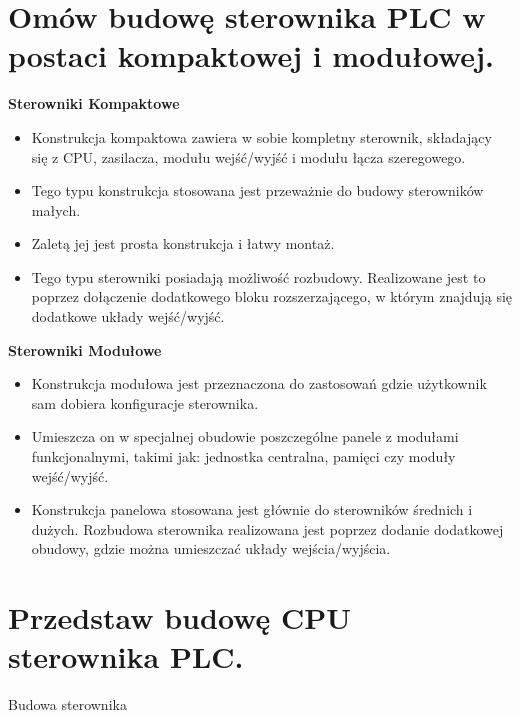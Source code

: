 \documentclass{article}
\begin{document}
	
	
	\section{ Omów budowę sterownika PLC w postaci kompaktowej i modułowej.}
	\textbf{Sterowniki  Kompaktowe}
	
	\begin{itemize}
	
	\item Konstrukcja kompaktowa  zawiera w sobie kompletny sterownik, składający się z CPU, zasilacza, modułu wejść/wyjść i modułu łącza szeregowego.
	
	\item Tego typu konstrukcja stosowana jest przeważnie do budowy sterowników małych.
	
	\item Zaletą jej jest prosta konstrukcja i łatwy montaż.
	
	\item Tego typu sterowniki posiadają możliwość rozbudowy. Realizowane jest to poprzez dołączenie dodatkowego bloku rozszerzającego, w którym znajdują się dodatkowe układy wejść/wyjść.
	
	\end{itemize}
	
	\textbf{Sterowniki Modułowe}
	
	\begin{itemize}
		
	\item Konstrukcja modułowa jest przeznaczona do zastosowań gdzie użytkownik sam dobiera konfiguracje sterownika.
	
	\item Umieszcza on w specjalnej obudowie poszczególne panele z modułami funkcjonalnymi, takimi jak: jednostka centralna, pamięci czy moduły wejść/wyjść.
	
	\item Konstrukcja panelowa stosowana jest głównie do sterowników średnich i dużych. Rozbudowa sterownika realizowana jest poprzez dodanie dodatkowej obudowy, gdzie można umieszczać układy wejścia/wyjścia.
	
	\end{itemize}
	
	\section{ Przedstaw budowę CPU sterownika PLC.}
	
	Budowa sterownika
	
\end{document}
